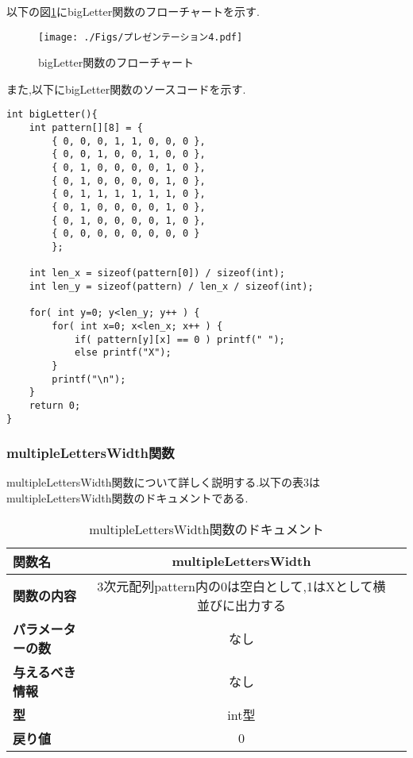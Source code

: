 \documentclass[uplatex,dvipdfmx]{jsarticle}
\begin{document}
以下の図\ref{fig:bigLetter関数のフローチャート}にbigLetter関数のフローチャートを示す.
\newpage
\begin{figure}[h]
    \centering
    \texttt{[image: ./Figs/プレゼンテーション4.pdf]}
    \caption{bigLetter関数のフローチャート}
    \label{fig:bigLetter関数のフローチャート}
\end{figure}

また,以下にbigLetter関数のソースコードを示す.
\begin{lstlisting}[firstnumber = 1, caption=大きな文字を表示する, label=code]   
int bigLetter(){
    int pattern[][8] = {
        { 0, 0, 0, 1, 1, 0, 0, 0 },
        { 0, 0, 1, 0, 0, 1, 0, 0 },
        { 0, 1, 0, 0, 0, 0, 1, 0 },
        { 0, 1, 0, 0, 0, 0, 1, 0 },
        { 0, 1, 1, 1, 1, 1, 1, 0 },
        { 0, 1, 0, 0, 0, 0, 1, 0 },
        { 0, 1, 0, 0, 0, 0, 1, 0 },
        { 0, 0, 0, 0, 0, 0, 0, 0 }
        };
    
    int len_x = sizeof(pattern[0]) / sizeof(int);
    int len_y = sizeof(pattern) / len_x / sizeof(int);
    
    for( int y=0; y<len_y; y++ ) {
        for( int x=0; x<len_x; x++ ) {
            if( pattern[y][x] == 0 ) printf(" ");
            else printf("X");
        }
        printf("\n");
    }
    return 0;
}
\end{lstlisting}

\subsubsection{multipleLettersWidth関数}
multipleLettersWidth関数について詳しく説明する.以下の表3はmultipleLettersWidth関数のドキュメントである.
\begin{table}[h]
    \centering
    \caption{multipleLettersWidth関数のドキュメント}
    \begin{tabular}{@{}lcc@{}}
    \toprule
    \textbf{関数名}         & \textbf{multipleLettersWidth}                                        \\ \midrule
    \textbf{関数の内容}                & 3次元配列pattern内の0は空白として,1はXとして横並びに出力する \\ 
    \textbf{パラメーターの数}               &     なし                                \\ 
    \textbf{与えるべき情報}             &     なし                        \\ 
    \textbf{型}                &     int型                    \\ 
    \textbf{戻り値}                & 0                              \\ \bottomrule
  \end{tabular}
\end{table}
\end{document}
